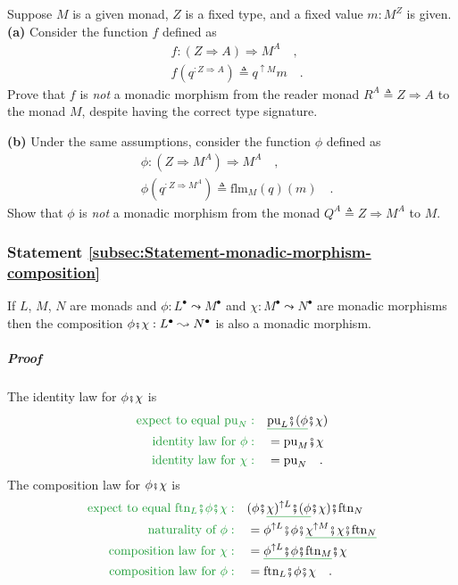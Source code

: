 Suppose $M$ is a given monad, $Z$ is a fixed type, and a fixed value
$m:M^{Z}$ is given. \textbf{(a)} Consider the function $f$ defined
as
\begin{align*}
 & f:\left(Z\Rightarrow A\right)\Rightarrow M^{A}\quad,\\
 & f\left(q^{:Z\Rightarrow A}\right)\triangleq q^{\uparrow M}m\quad.
\end{align*}
Prove that $f$ is \emph{not} a monadic morphism from the reader monad
$R^{A}\triangleq Z\Rightarrow A$ to the monad $M$, despite having
the correct type signature.

\textbf{(b)} Under the same assumptions, consider the function $\phi$
defined as
\begin{align*}
 & \phi:\left(Z\Rightarrow M^{A}\right)\Rightarrow M^{A}\quad,\\
 & \phi\left(q^{:Z\Rightarrow M^{A}}\right)\triangleq\text{flm}_{M}\left(q\right)\left(m\right)\quad.
\end{align*}
Show that $\phi$ is \emph{not} a monadic morphism from the monad
$Q^{A}\triangleq Z\Rightarrow M^{A}$ to $M$.

\subsubsection{Statement \label{subsec:Statement-monadic-morphism-composition}\ref{subsec:Statement-monadic-morphism-composition}}

If $L$, $M$, $N$ are monads and $\phi:L^{\bullet}\leadsto M^{\bullet}$
and $\chi:M^{\bullet}\leadsto N^{\bullet}$ are monadic morphisms
then the composition $\phi\bef\chi:L^{\bullet}\leadsto N^{\bullet}$
is also a monadic morphism.

\subparagraph{Proof}

The identity law for $\phi\bef\chi$ is
\begin{align*}
{\color{greenunder}\text{expect to equal }\text{pu}_{N}:}\quad & \gunderline{\text{pu}_{L}\bef(\phi}\bef\chi)\\
{\color{greenunder}\text{identity law for }\phi:}\quad & =\text{pu}_{M}\bef\chi\\
{\color{greenunder}\text{identity law for }\chi:}\quad & =\text{pu}_{N}\quad.
\end{align*}
The composition law for $\phi\bef\chi$ is
\begin{align*}
{\color{greenunder}\text{expect to equal }\text{ftn}_{L}\bef\phi\bef\chi:}\quad & (\phi\bef\gunderline{\chi)^{\uparrow L}\bef(\phi}\bef\chi)\bef\text{ftn}_{N}\\
{\color{greenunder}\text{naturality of }\phi:}\quad & =\phi^{\uparrow L}\bef\phi\bef\gunderline{\chi^{\uparrow M}\bef\chi\bef\text{ftn}_{N}}\\
{\color{greenunder}\text{composition law for }\chi:}\quad & =\gunderline{\phi^{\uparrow L}\bef\phi\bef\text{ftn}_{M}}\bef\chi\\
{\color{greenunder}\text{composition law for }\phi:}\quad & =\text{ftn}_{L}\bef\phi\bef\chi\quad.
\end{align*}


